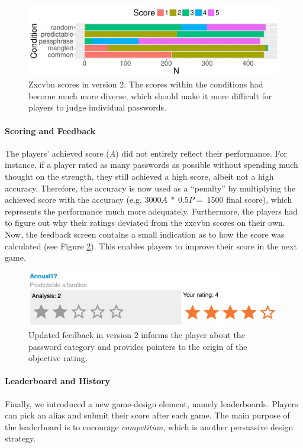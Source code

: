 \begin{figure}[htbp]
	\centering
	\includegraphics[width=0.7\linewidth]{figures/pasdjo/score-distribution-v2}
	\caption{\label{fig:pasdjo:score-distribution-v2}Zxcvbn scores in version 2. The scores within the conditions had become much more diverse, which should make it more difficult for players to judge individual passwords.}
\end{figure}

\paragraph{Scoring and Feedback} The players' achieved score ($A$) did not entirely reflect their performance. For instance, if a player rated as many passwords as possible without spending much thought on the strength, they still achieved a high score, albeit not a high accuracy. Therefore, the accuracy is now used as a ``penalty'' by multiplying the achieved score with the accuracy (e.g. $3000A~*~0.5P=~1500$ final score), which represents the performance much more adequately. Furthermore, the players had to figure out why their ratings deviated from the zxcvbn scores on their own. Now, the feedback screen contains a small indication as to how the score was calculated  (see Figure \ref{fig:pasdjo:updated-feedback}). This enables players to improve their score in the next game. 

\begin{figure}[htbp]
	\centering
	\includegraphics[width=0.7\linewidth]{figures/pasdjo/updated-feedback}
	\caption{\label{fig:pasdjo:updated-feedback}Updated feedback in version 2 informs the player about the password category and provides pointers to the origin of the objective rating. }
\end{figure}



\paragraph{Leaderboard and History} Finally, we introduced a new game-design element, namely leaderboards. Players can pick an alias and submit their score after each game. The main purpose of the leaderboard is to encourage \textit{competition}, which is another persuasive design strategy. 

